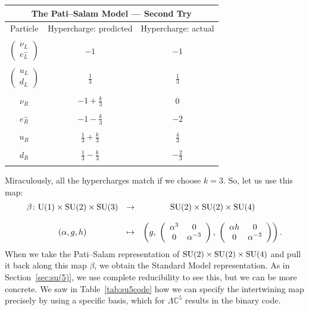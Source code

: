 \documentclass{article}
\newcommand{\maps}{\colon}    %
\newcommand{\C}{{\mathbb C}}  %
\newcommand{\U}{{\rm U}}    %
\newcommand{\SU}{{\rm SU}}    %
\newcommand{\third}{\frac{1}{3}} %
\newcommand{\twothirds}{\frac{2}{3}} %
\newcommand{\fourthirds}{\frac{4}{3}} %
\newcommand{\lep}{\left( \! \begin{array}{c} \nu_L \\ e^-_L \end{array} \! \right)} %
\newcommand{\quark}{\left( \! \begin{array}{c} u_L \\ d_L \end{array} \! \right)} %
\begin{document}
\begin{table}[H]
	\renewcommand{\arraystretch}{0.8}
\begin{center}
	\begin{tabular}{ccc}
         \hline
	 \multicolumn{3}{|c|}{\bf{The Pati--Salam Model --- Second Try}} \\
         \hline
 Particle   & Hypercharge: predicted  & Hypercharge: actual \\  
\hline                              
\\
 $\lep$     & $-1$ & $-1$
\\    \\                                                               
 $\quark$   & $\third$ & $\third$  
\\     \\                                                               
 $\nu_R$    & $-1 + \frac{k}{3}$ & $0$
\\     \\                                                               
 $e^-_R$    & $-1 - \frac{k}{3}$  & $-2$    
\\     \\                                                               
 $u_R$      & $\third + \frac{k}{3}$ & $\fourthirds$
\\     \\                                                               
 $d_R$      & $\third - \frac{k}{3}$ &  $-\twothirds$          
\\    \\
         \hline                              
	\end{tabular}
	\vspace{-10pt}
\end{center}
	\renewcommand{\arraystretch}{1}
\end{table}

\noindent
Miraculously, all the hypercharges match if we choose $k = 3$.
So, let us use this map:
\[ \begin{array}{ccc}
\beta \maps \U(1) \times \SU(2) \times \SU(3) 
&\to& \SU(2) \times \SU(2) \times \SU(4) \\  \\
  (\alpha, g, h)  &\mapsto&  
\left( g, \;
\left(
\begin{array}{c c}
	\alpha^3 & 0 \\
	0 & \alpha^{-3}
\end{array}
\right), \;
\left(
\begin{array}{c c}
	\alpha h & 0 \\
	0 & \alpha^{-3}
\end{array}
\right) 
\right).
\end{array}
\]
When we take the Pati--Salam representation of 
$\SU(2) \times \SU(2) \times \SU(4)$
and pull it back along this map $\beta$, we obtain the Standard Model
representation. As in Section~\ref{sec:su(5)}, we use complete reducibility to
see this, but we can be more concrete. We saw in Table~\ref{tab:su5code} how we
can specify the intertwining map precisely by using a specific basis, which for
$\Lambda \C^5$ results in the binary code.
\end{document}
